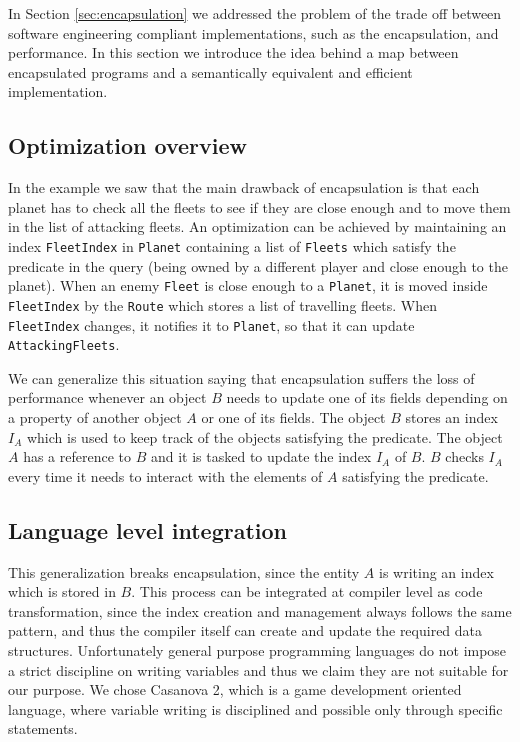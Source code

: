 In Section \ref{sec:encapsulation} we addressed the problem of the trade off between software engineering compliant implementations, such as the encapsulation, and performance. In this section we introduce the idea behind a map between encapsulated programs and a semantically equivalent and efficient implementation.

\subsection{Optimization overview}

In the example we saw that the main drawback of encapsulation is that each planet has to check all the fleets to see if they are close enough and to move them in the list of attacking fleets. An optimization can be achieved by maintaining an index \texttt{FleetIndex} in \texttt{Planet} containing a list of \texttt{Fleets} which satisfy the predicate in the query (being owned by a different player and close enough to the planet). When an enemy \texttt{Fleet} is close enough to a \texttt{Planet}, it is moved inside \texttt{FleetIndex} by the \texttt{Route} which stores a list of travelling fleets. When \texttt{FleetIndex}  changes, it notifies it to \texttt{Planet}, so that it can update \texttt{AttackingFleets}.

We can generalize this situation saying that encapsulation suffers the loss of performance whenever an object $B$ needs to update one of its fields depending on a property of another object $A$ or one of its fields. The object $B$ stores an index $I_{A}$ which is used to keep track of the objects satisfying the predicate. The object $A$ has a reference to $B$ and it is tasked to update the index $I_{A}$ of $B$. $B$ checks $I_{A}$ every time it needs to interact with the elements of $A$ satisfying the predicate.

\subsection{Language level integration}

This generalization breaks encapsulation, since the entity $A$ is writing an index which is stored in $B$. This process can be integrated at compiler level as code transformation, since the index creation and management always follows the same pattern, and thus the compiler itself can create and update the required data structures. Unfortunately general purpose programming languages do not impose a strict discipline on writing variables and thus we claim they are not suitable for our purpose. We chose Casanova 2, which is a game development oriented language, where variable writing is disciplined and possible only through specific statements.

